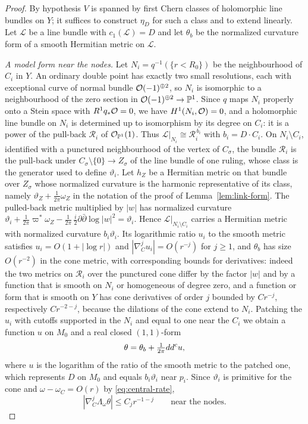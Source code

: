 \begin{proof}
By hypothesis $V$ is spanned by first Chern classes of holomorphic line
bundles on $Y$; it suffices to construct $\eta_D$ for such a class and to
extend linearly. Let $\mathcal L$ be a line bundle with $c_1(\mathcal L)=D$
and let $\theta_b$ be the normalized curvature form of a smooth Hermitian
metric on $\mathcal L$.

\emph{A model form near the nodes.} Let $N_i=q^{-1}(\{r<R_0\})$ be the
neighbourhood of $C_i$ in $Y$. An ordinary double point has exactly two small resolutions, each with
exceptional curve of normal bundle $\mathcal O(-1)^{\oplus2}$, so $N_i$ is
isomorphic to a neighbourhood of the zero section in
$\mathcal O(-1)^{\oplus2}\to\mathbb P^1$. Since $q$ maps $N_i$ properly onto a Stein
space with $R^1q_*\mathcal O=0$, we have $H^1(N_i,\mathcal O)=0$, and a holomorphic
line bundle on $N_i$ is determined up to isomorphism by its degree on
$C_i$: it is a power of the pull-back $\mathcal R_i$ of
$\mathcal O_{\mathbb P^1}(1)$. Thus
$\mathcal L|_{N_i}\cong\mathcal R_i^{\,b_i}$ with $b_i=D\cdot C_i$. On
$N_i\setminus C_i$, identified with a punctured neighbourhood of the
vertex of $C_\sigma$, the bundle $\mathcal R_i$ is the pull-back under
$C_\sigma\setminus\{0\}\to Z_\sigma$ of the line bundle of one ruling,
whose class is the generator used to define $\vartheta_i$. Let $h_Z$ be a
Hermitian metric on that bundle over $Z_\sigma$ whose normalized curvature
is the harmonic representative of its class, namely
$\vartheta_Z+\tfrac1{2\pi}\omega_Z$ in the notation of the proof of
Lemma~\ref{lem:link-form}. The pulled-back metric multiplied by $|w|$
has normalized curvature
$\vartheta_i+\tfrac1{2\pi}\varpi^*\omega_Z-\tfrac1{2\pi}\,\tfrac i2\partial
\bar\partial\log|w|^2=\vartheta_i$. Hence $\mathcal L|_{N_i\setminus
C_i}$ carries a Hermitian metric with normalized curvature
$b_i\vartheta_i$. Its logarithmic ratio $u_i$ to the smooth metric
satisfies $u_i=O(1+|\log r|)$ and $|\nabla_C^ju_i|=O(r^{-j})$ for
$j\ge1$, and $\theta_b$ has size $O(r^{-2})$ in the cone metric, with
corresponding bounds for derivatives: indeed the two metrics on $\mathcal R_i$ over the punctured cone differ
by the factor $|w|$ and by a function that is smooth on $N_i$ or
homogeneous of degree zero, and a function or form that is smooth on
$Y$ has cone derivatives of order $j$ bounded by $Cr^{-j}$, respectively
$Cr^{-2-j}$, because the dilations of the cone extend to $N_i$. Patching the $u_i$ with
cutoffs supported in the $N_i$ and equal to one near the $C_i$ we obtain
a function $u$ on $M_0$ and a real closed $(1,1)$-form
\[
 \theta=\theta_b+\tfrac1{2\pi}dd^c u ,
\]
where $u$ is the logarithm of the ratio of the smooth metric to the
patched one, which represents $D$ on $M_0$ and equals
$b_i\vartheta_i$ near $p_i$. Since $\vartheta_i$ is primitive for the
cone and $\omega-\omega_C=O(r)$ by \eqref{eq:central-rate},
\begin{equation}\label{eq:contraction-decay}
 |\nabla_C^j\Lambda_\omega\theta|\le C_jr^{-1-j}\qquad\text{near the nodes.}
\end{equation}


\end{proof}
